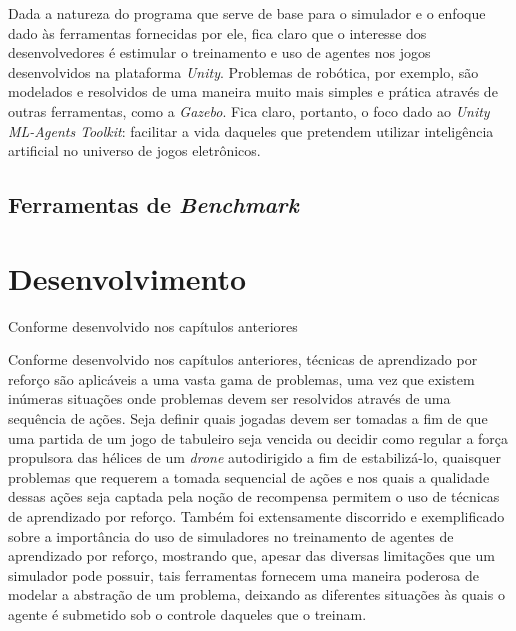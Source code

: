 \documentclass[cic,tc]{iiufrgs}
\begin{document}
Dada a natureza do programa que serve de base para o simulador e o enfoque dado
às ferramentas fornecidas por ele, fica claro que o interesse dos
desenvolvedores é estimular o treinamento e uso de agentes nos jogos
desenvolvidos na plataforma \textit{Unity}. Problemas de robótica, por exemplo,
são modelados e resolvidos de uma maneira muito mais simples e prática através
de outras ferramentas, como a \textit{Gazebo}. Fica claro, portanto, o foco dado
ao \textit{Unity ML-Agents Toolkit}: facilitar a vida daqueles que pretendem
utilizar inteligência artificial no universo de jogos eletrônicos.


\section{Ferramentas de \textit{Benchmark}}
\label{benchmark}



\chapter{Desenvolvimento}
\label{desenvolvimento}


Conforme desenvolvido nos capítulos anteriores




Conforme desenvolvido nos capítulos anteriores, técnicas de aprendizado por
reforço são aplicáveis a uma vasta gama de problemas, uma vez que existem
inúmeras situações onde problemas devem ser resolvidos através de uma sequência
de ações. Seja definir quais jogadas devem ser tomadas a fim de que uma partida
de um jogo de tabuleiro seja vencida ou decidir como regular a força propulsora
das hélices de um \textit{drone} autodirigido a fim de estabilizá-lo, quaisquer
problemas que requerem a tomada sequencial de ações e nos quais a qualidade
dessas ações seja captada pela noção de recompensa permitem o uso de técnicas de
aprendizado por reforço. Também foi extensamente discorrido e exemplificado
sobre a importância do uso de simuladores no treinamento de agentes de
aprendizado por reforço, mostrando que, apesar das diversas limitações que um
simulador pode possuir, tais ferramentas fornecem uma maneira poderosa de
modelar a abstração de um problema, deixando as diferentes situações às quais
o agente é submetido sob o controle daqueles que o treinam.
\end{document}
